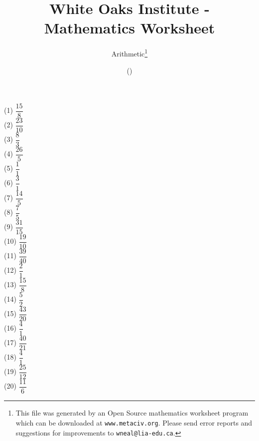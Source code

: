 \documentclass[letter]{article}
\begin{document}
\title{White Oaks Institute - Mathematics Worksheet}
\author{Arithmetic\thanks{This file was generated by an \textsf{Open Source} mathematics worksheet program which can be downloaded at \texttt{www.metaciv.org}. Please send error reports and suggestions for improvements to \texttt{wneal@lia-edu.ca}.}}
\date{\XCfileversion{} (\XCfiledate)}
\maketitle
\setlength{\parskip}{12mm plus 4mm minus 4mm}\setlength{\parindent}{0cm}\begin{multicols}{2}(1) $\dfrac{15}{8}$\\(2) $\dfrac{23}{10}$\\(3) $\dfrac{8}{3}$\\(4) $\dfrac{26}{5}$\\(5) $\dfrac{1}{1}$\\(6) $\dfrac{3}{1}$\\(7) $\dfrac{14}{5}$\\(8) $\dfrac{7}{5}$\\(9) $\dfrac{31}{15}$\\(10) $\dfrac{19}{10}$\\(11) $\dfrac{39}{40}$\\(12) $\dfrac{2}{1}$\\(13) $\dfrac{15}{8}$\\(14) $\dfrac{5}{2}$\\(15) $\dfrac{43}{20}$\\(16) $\dfrac{4}{1}$\\(17) $\dfrac{40}{21}$\\(18) $\dfrac{4}{1}$\\(19) $\dfrac{25}{12}$\\(20) $\dfrac{11}{6}$\\\end{multicols}
\end{document}
